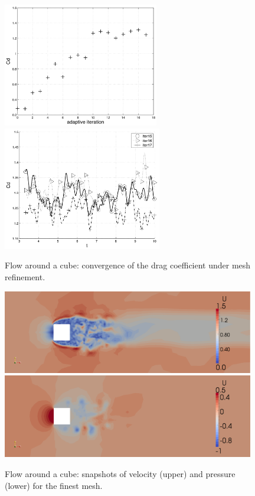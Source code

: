 \begin{figure}
\centering
\includegraphics[height=5.4cm]{chapters/hoffman-1/png/fig1a.png}
\includegraphics[height=5.4cm]{chapters/hoffman-1/png/fig1b.png}
\caption{Flow around a cube: convergence of the drag coefficient under
mesh refinement.}
\label{fig:cube1}
\end{figure}

\begin{figure}
\centering
\includegraphics[width=11cm]{chapters/hoffman-1/png/fig2b.png}
\medskip
\includegraphics[width=11cm]{chapters/hoffman-1/png/fig2c.png}
\caption{Flow around a cube: snapshots of velocity (upper) and pressure
(lower) for the finest mesh.}
\label{fig:cube2}
\end{figure}

